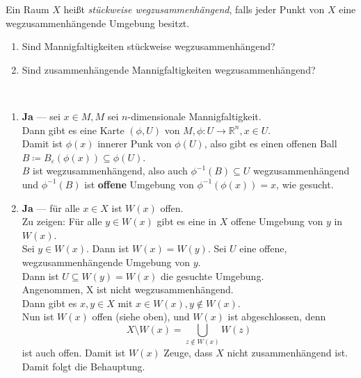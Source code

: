 \begin{assignment}
  Ein Raum \( X \) heißt \emph{stückweise wegzusammenhängend}, falls jeder Punkt von \( X \) eine wegzusammenhängende Umgebung besitzt.
  \begin{enumerate}[label= (\alph*)]
    \item Sind Mannigfaltigkeiten stückweise wegzusammenhängend?
    \item Sind zusammenhängende Mannigfaltigkeiten wegzusammenhängend?
  \end{enumerate}
\end{assignment}
\begin{solution}
  \
  \begin{enumerate}[label= (\alph*)]
    \item \textbf{Ja} --- sei \( x \in M, M \) sei \( n \)-dimensionale Mannigfaltigkeit. \\
    Dann gibt es eine Karte \( (\phi, U) \) von \( M, \phi: U \to \mathbb{R}^n, x \in U \). \\
    Damit ist \( \phi(x) \) innerer Punk von \( \phi(U) \), also gibt es einen offenen Ball \\ \( B \coloneqq B_\varepsilon(\phi(x)) \subseteq \phi(U) \). \\
    \( B \) ist wegzusammenhängend, also auch \( \phi^{-1}(B) \subseteq U \) wegzusammenhängend und \( \phi^{-1}(B) \) ist \textbf{offene} Umgebung von \( \phi^{-1}(\phi(x)) = x \), wie gesucht.
    
    \item \textbf{Ja} --- für alle \( x \in X \) ist \( W(x) \) offen. \\
    Zu zeigen: Für alle \( y \in W(x) \) gibt es eine in \( X \) offene Umgebung von \( y \) in \( W(x) \). \\
    Sei \( y \in W(x) \). Dann ist \( W(x) = W(y) \). Sei \( U \) eine offene, wegzusammenhängende Umgebung von \( y \). \\
    Dann ist \( U \subseteq W(y) = W(x) \) die gesuchte Umgebung. \\
    Angenommen, X ist nicht wegzusammenhängend. \\
    Dann gibt es \( x,y \in X \) mit \( x \in W(x), y \notin W(x) \). \\
    Nun ist \( W(x) \) offen (siehe oben), und \( W(x) \) ist abgeschlossen, denn
    \begin{equation*}
      X \setminus W(x) = \bigcup_{z \notin W(x)} W(z)
    \end{equation*}
    ist auch offen. Damit ist \( W(x) \) Zeuge, dass \( X \) nicht zusammenhängend ist. Damit folgt die Behauptung.
  \end{enumerate}
\end{solution}



